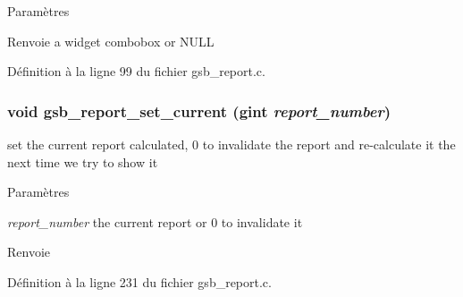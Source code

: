 \begin{DoxyParams}{Paramètres}
\item[{\em }]\end{DoxyParams}
\begin{DoxyReturn}{Renvoie}
a widget combobox or NULL 
\end{DoxyReturn}


Définition à la ligne 99 du fichier gsb\_\-report.c.

\subsubsection[{gsb\_\-report\_\-set\_\-current}]{\setlength{\rightskip}{0pt plus 5cm}void gsb\_\-report\_\-set\_\-current (gint {\em report\_\-number})}\label{gsb__report_8h_a51d50ccf9e1c9ddeb43b0bb61a5af19e}
set the current report calculated, 0 to invalidate the report and re-\/calculate it the next time we try to show it


\begin{DoxyParams}{Paramètres}
\item[{\em report\_\-number}]the current report or 0 to invalidate it\end{DoxyParams}
\begin{DoxyReturn}{Renvoie}

\end{DoxyReturn}


Définition à la ligne 231 du fichier gsb\_\-report.c.

